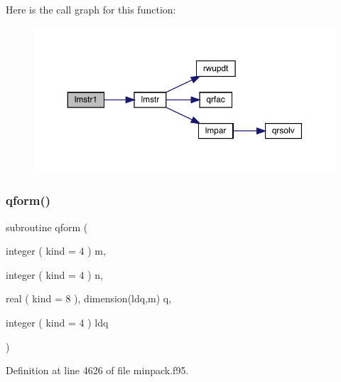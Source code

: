 Here is the call graph for this function\+:\nopagebreak
\begin{figure}[H]
\begin{center}
\leavevmode
\includegraphics[width=350pt]{minpack_8f95_acee42ee803b3870261fa529dc123a892_cgraph}
\end{center}
\end{figure}
\mbox{\label{minpack_8f95_a12e8db1e181463d5c3af21f2b1b6b5a7}} 
\subsubsection{\texorpdfstring{qform()}{qform()}}
{\footnotesize\ttfamily subroutine qform (\begin{DoxyParamCaption}\item[{integer ( kind = 4 )}]{m,  }\item[{integer ( kind = 4 )}]{n,  }\item[{real ( kind = 8 ), dimension(ldq,m)}]{q,  }\item[{integer ( kind = 4 )}]{ldq }\end{DoxyParamCaption})}



Definition at line 4626 of file minpack.\+f95.

\mbox{\label{minpack_8f95_a64d35f73f2a85378c24dd7b99ddb0c0f}} 
